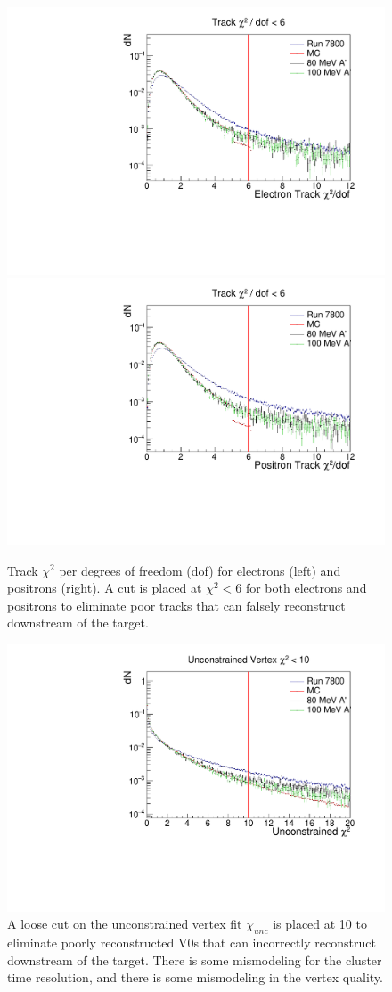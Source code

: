  \begin{figure}[t]
    \centering
    \includegraphics[width=.45\textwidth]{figs/recon/pre_eleTrkChisq.pdf}
    \includegraphics[width=.45\textwidth]{figs/recon/pre_posTrkChisq.pdf}
    \caption{Track $\chi^2$ per degrees of freedom (dof) for electrons (left) and positrons (right). A cut is placed at $\chi^2<6$ for both electrons and positrons to eliminate poor tracks that can falsely reconstruct downstream of the target.}
    \label{fig:pre_trkChisq}
\end{figure}

\begin{figure}[t]
    \centering
    \includegraphics[width=.45\textwidth]{figs/recon/pre_uncChisq.pdf}
    \caption{%
    A loose cut on the unconstrained vertex fit $\chi_{unc}$ is placed at 10 to eliminate poorly reconstructed V0s that can incorrectly reconstruct downstream of the target. There is some mismodeling for the cluster time resolution, and there is some mismodeling in the vertex quality.}
    \label{fig:pre_clT_uncChisq2}
\end{figure}

